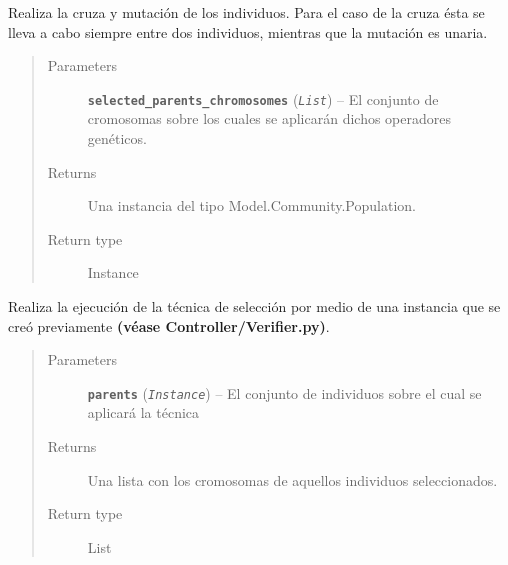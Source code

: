 \documentclass[letterpaper,10pt,english]{sphinxmanual}
\begin{document}
\begin{fulllineitems}
\begin{fulllineitems}
\end{fulllineitems}


\begin{fulllineitems}
\label{Model/Community/Community:Model.Community.Community.Community.execute_crossover_and_mutation}
Realiza la cruza y mutación de los individuos. Para el caso de la cruza ésta se lleva a cabo siempre
entre dos individuos, mientras que la mutación es unaria.
\begin{quote}\begin{description}
\item[{Parameters}] \leavevmode
\textbf{\texttt{selected\_parents\_chromosomes}} (\emph{\texttt{List}}) -- El conjunto de cromosomas sobre los cuales se aplicarán dichos operadores genéticos.

\item[{Returns}] \leavevmode
Una instancia del tipo Model.Community.Population.

\item[{Return type}] \leavevmode
Instance

\end{description}\end{quote}

\end{fulllineitems}


\begin{fulllineitems}
\label{Model/Community/Community:Model.Community.Community.Community.execute_selection}
Realiza la ejecución de la técnica de selección por medio de una instancia que
se creó previamente \textbf{(véase Controller/Verifier.py)}.
\begin{quote}\begin{description}
\item[{Parameters}] \leavevmode
\textbf{\texttt{parents}} (\emph{\texttt{Instance}}) -- El conjunto de individuos sobre el cual se aplicará la técnica

\item[{Returns}] \leavevmode
Una lista con los cromosomas de aquellos individuos seleccionados.

\item[{Return type}] \leavevmode
List


\end{description}
\end{quote}
\end{fulllineitems}
\end{fulllineitems}
\end{document}
